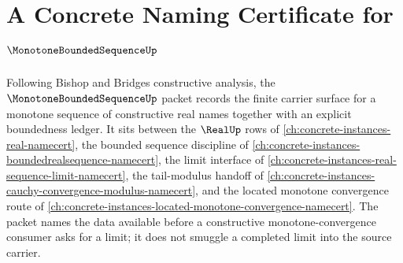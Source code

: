 \chapter{A Concrete Naming Certificate for $\MonotoneBoundedSequenceUp$}
\label{ch:concrete-instances-monotone-bounded-sequence-namecert}

Following Bishop and Bridges constructive analysis, the $\MonotoneBoundedSequenceUp$ packet records the finite carrier surface for a monotone sequence of constructive real names together with an explicit boundedness ledger. It sits between the $\RealUp$ rows of \autoref{ch:concrete-instances-real-namecert}, the bounded sequence discipline of \autoref{ch:concrete-instances-boundedrealsequence-namecert}, the limit interface of \autoref{ch:concrete-instances-real-sequence-limit-namecert}, the tail-modulus handoff of \autoref{ch:concrete-instances-cauchy-convergence-modulus-namecert}, and the located monotone convergence route of \autoref{ch:concrete-instances-located-monotone-convergence-namecert}. The packet names the data available before a constructive monotone-convergence consumer asks for a limit; it does not smuggle a completed limit into the source carrier.

